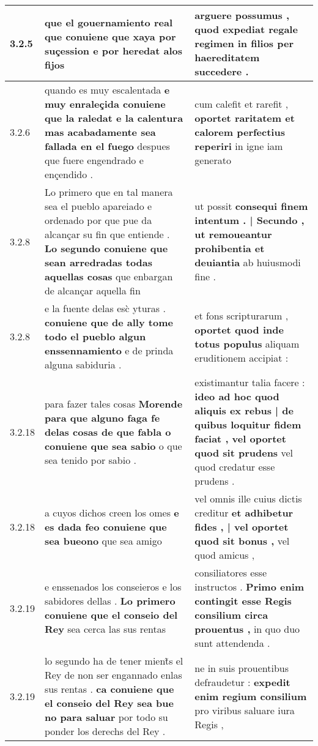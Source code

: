 \begin{tabular}{|p{1cm}|p{6.5cm}|p{6.5cm}|}
3.2.5 & que el gouernamiento real \textbf{ que conuiene que xaya por suçession } e por heredat alos fijos & arguere possumus , \textbf{ quod expediat regale regimen } in filios per haereditatem succedere . \\\hline
3.2.6 & quando es muy escalentada \textbf{ e muy enraleçida conuiene que la raledat e la calentura mas acabadamente sea fallada en el fuego } despues que fuere engendrado e ençendido . & cum calefit et rarefit , \textbf{ oportet raritatem et calorem perfectius reperiri } in igne iam generato \\\hline
3.2.8 & Lo primero que en tal manera sea el pueblo apareiado e ordenado por que pue da alcançar su fin que entiende . \textbf{ Lo segundo conuiene que sean arredradas todas aquellas cosas } que enbargan de alcançar aquella fin & ut possit \textbf{ consequi finem intentum . | Secundo , ut remoueantur prohibentia et deuiantia } ab huiusmodi fine . \\\hline
3.2.8 & e la fuente delas esc̀ yturas . \textbf{ conuiene que de ally tome todo el pueblo algun enssennamiento } e de prinda alguna sabiduria . & et fons scripturarum , \textbf{ oportet quod inde totus populus } aliquam eruditionem accipiat : \\\hline
3.2.18 & para fazer tales cosas \textbf{ Morende para que alguno faga fe delas cosas de que fabla o conuiene que sea sabio } o que sea tenido por sabio . & existimantur talia facere : \textbf{ ideo ad hoc quod aliquis ex rebus | de quibus loquitur fidem faciat , vel oportet quod sit prudens } vel quod credatur esse prudens . \\\hline
3.2.18 & a cuyos dichos creen los omes \textbf{ e es dada feo conuiene que sea bueono } que sea amigo & vel omnis ille cuius dictis creditur \textbf{ et adhibetur fides , | vel oportet quod sit bonus , } vel quod amicus , \\\hline
3.2.19 & e enssenados los conseieros e los sabidores dellas . \textbf{ Lo primero conuiene que el conseio del Rey } sea cerca las sus rentas & consiliatores esse instructos . \textbf{ Primo enim contingit esse Regis consilium circa prouentus , } in quo duo sunt attendenda . \\\hline
3.2.19 & lo segundo ha de tener mient̃s el Rey de non ser engannado enlas sus rentas . \textbf{ ca conuiene que el conseio del Rey sea bue no para saluar } por todo su ponder los derechs del Rey . & ne in suis prouentibus defraudetur : \textbf{ expedit enim regium consilium } pro viribus saluare iura Regis , \\\hline

\end{tabular}
